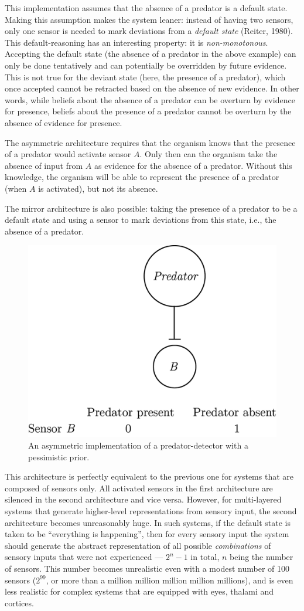 \documentclass[12pt,twoside]{reedthesis}
\begin{document}
This implementation assumes that the absence of a predator is a default state. Making this assumption makes the system leaner: instead of having two sensors, only one sensor is needed to mark deviations from a \emph{default state} (Reiter, 1980). This default-reasoning has an interesting property: it is \emph{non-monotonous}. Accepting the default state (the absence of a predator in the above example) can only be done tentatively and can potentially be overridden by future evidence. This is not true for the deviant state (here, the presence of a predator), which once accepted cannot be retracted based on the absence of new evidence. In other words, while beliefs about the absence of a predator can be overturn by evidence for presence, beliefs about the presence of a predator cannot be overturn by the absence of evidence for presence.

The asymmetric architecture requires that the organism knows that the presence of a predator would activate sensor \(A\). Only then can the organism take the absence of input from \(A\) as evidence for the absence of a predator. Without this knowledge, the organism will be able to represent the presence of a predator (when \(A\) is activated), but not its absence.

The mirror architecture is also possible: taking the presence of a predator to be a default state and using a sensor to mark deviations from this state, i.e., the absence of a predator.
\begin{figure}
\includegraphics[width=0.5\linewidth]{figure/intro/pessimistic} \caption{An asymmetric implementation of a predator-detector with a pessimistic prior.}\label{fig:intro-pessimistic}
\end{figure}
This architecture is perfectly equivalent to the previous one for systems that are composed of sensors only. All activated sensors in the first architecture are silenced in the second architecture and vice versa. However, for multi-layered systems that generate higher-level representations from sensory input, the second architecture becomes unreasonably huge. In such systems, if the default state is taken to be ``everything is happening'', then for every sensory input the system should generate the abstract representation of all possible \emph{combinations} of sensory inputs that were not experienced --- \(2^n-1\) in total, \(n\) being the number of sensors. This number becomes unrealistic even with a modest number of 100 sensors (\(2^{99}\), or more than a million million million million millions), and is even less realistic for complex systems that are equipped with eyes, thalami and cortices.
\end{document}
